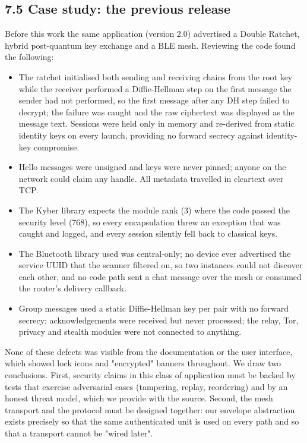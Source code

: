 \documentclass[conference]{IEEEtran}
\begin{document}
\subsection{7.5 Case study: the previous release}
Before this work the same application (version 2.0) advertised a Double Ratchet, hybrid post-quantum key exchange and a BLE mesh. Reviewing the code found the following:

\begin{itemize}
  \item The ratchet initialised both sending and receiving chains from the root key while the receiver performed a Diffie-Hellman step on the first message the sender had not performed, so the first message after any DH step failed to decrypt; the failure was caught and the raw ciphertext was displayed as the message text. Sessions were held only in memory and re-derived from static identity keys on every launch, providing no forward secrecy against identity-key compromise.
  \item Hello messages were unsigned and keys were never pinned; anyone on the network could claim any handle. All metadata travelled in cleartext over TCP.
  \item The Kyber library expects the module rank (3) where the code passed the security level (768), so every encapsulation threw an exception that was caught and logged, and every session silently fell back to classical keys.
  \item The Bluetooth library used was central-only; no device ever advertised the service UUID that the scanner filtered on, so two instances could not discover each other, and no code path sent a chat message over the mesh or consumed the router's delivery callback.
  \item Group messages used a static Diffie-Hellman key per pair with no forward secrecy; acknowledgements were received but never processed; the relay, Tor, privacy and stealth modules were not connected to anything.
\end{itemize}
None of these defects was visible from the documentation or the user interface, which showed lock icons and "encrypted" banners throughout. We draw two conclusions. First, security claims in this class of application must be backed by tests that exercise adversarial cases (tampering, replay, reordering) and by an honest threat model, which we provide with the source. Second, the mesh transport and the protocol must be designed together: our envelope abstraction exists precisely so that the same authenticated unit is used on every path and so that a transport cannot be "wired later".
\end{document}
